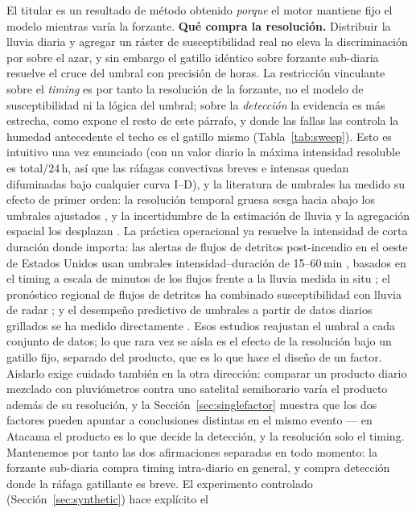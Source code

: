 \documentclass[authoryear,preprint,review,12pt]{elsarticle}
\begin{document}
El titular es un resultado de método obtenido \emph{porque} el motor mantiene fijo
el modelo mientras varía la forzante. \textbf{Qué compra la resolución.} Distribuir
la lluvia diaria y agregar un ráster de susceptibilidad real no eleva la
discriminación por sobre el azar, y sin embargo el gatillo idéntico sobre forzante
sub-diaria resuelve el cruce del umbral con precisión de horas. La restricción
vinculante sobre el \emph{timing} es por tanto la resolución de la forzante, no el modelo de
susceptibilidad ni la lógica del umbral; sobre la \emph{detección} la evidencia es más estrecha, como expone el resto de este párrafo, y donde las fallas las controla la humedad antecedente el techo es el gatillo mismo (Tabla~\ref{tab:sweep}). Esto es intuitivo una vez enunciado (con
un valor diario la máxima intensidad resoluble es total$/24$\,h, así que las
ráfagas convectivas breves e intensas quedan difuminadas bajo cualquier curva
I--D), y la literatura de umbrales ha medido su efecto de primer orden: la resolución temporal gruesa sesga hacia abajo los umbrales ajustados \citep{marra2019,gariano2020}, y la incertidumbre de la estimación de lluvia y la agregación espacial los desplazan \citep{nikolopoulos2014,marra2017}. La práctica operacional ya resuelve la intensidad de corta duración donde importa:
las alertas de flujos de detritos post-incendio en el oeste de Estados Unidos usan
umbrales intensidad--duración de 15--60\,min \citep{staley2017}, basados en el
timing a escala de minutos de los flujos frente a la lluvia medida in situ
\citep{kean2011}; el pronóstico regional de flujos de detritos ha combinado
susceptibilidad con lluvia de radar \citep{berenguer2015}; y el desempeño predictivo
de umbrales a partir de datos diarios grillados se ha medido directamente
\citep{leonarduzzi2017}. Esos estudios reajustan el umbral a cada conjunto de datos; lo que rara vez se aísla es el efecto de la resolución bajo un gatillo fijo, separado del producto, que es lo que hace el diseño de un factor. Aislarlo exige cuidado
también en la otra dirección: comparar un producto diario mezclado con
pluviómetros contra uno satelital semihorario varía el producto además de su
resolución, y la Sección~\ref{sec:singlefactor} muestra que los dos factores pueden
apuntar a conclusiones distintas en el mismo evento --- en Atacama el producto es
lo que decide la detección, y la resolución solo el timing. Mantenemos por tanto
las dos afirmaciones separadas en todo momento: la forzante sub-diaria compra
timing intra-diario en general, y compra detección donde la ráfaga gatillante es
breve. El experimento controlado (Sección~\ref{sec:synthetic}) hace explícito el
\end{document}
